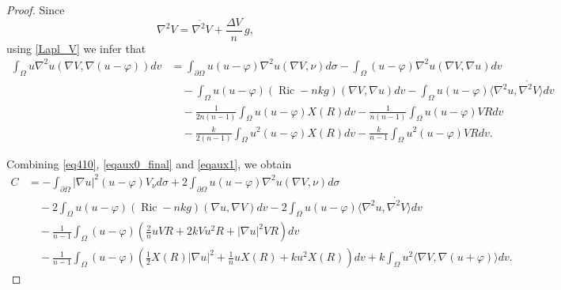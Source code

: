 \documentclass[10pt,a4paper]{amsart}
\begin{document}
\begin{proof}
Since
\[
\nabla^{2}V
=
\mathring{\nabla^{2}V}
+
\frac{\Delta V}{n}\,g,
\]
using \eqref{Lapl_V} we infer that
\begin{align}\label{eqaux1}
\int_{\Omega}u\nabla^{2}u(\nabla V,\nabla(u-\varphi))dv
&=
\int_{\partial\Omega}u(u-\varphi)\nabla^{2}u(\nabla V,\nu)d\sigma
-
\int_{\Omega}(u-\varphi)\nabla^{2}u(\nabla V,\nabla u) dv
\nonumber\\
&\quad
-
\int_{\Omega}u(u-\varphi)(\operatorname{Ric}-nkg)(\nabla V,\nabla u) dv
-
\int_{\Omega}u(u-\varphi)
\langle\nabla^{2}u,\mathring{\nabla^{2}V}\rangle dv
\nonumber\\
&\quad
-
\frac{1}{2n(n-1)}
\int_{\Omega}u(u-\varphi)X(R) dv
-
\frac{1}{n(n-1)}
\int_{\Omega}u(u-\varphi)VR dv
\nonumber\\
&\quad
-
\frac{k}{2(n-1)}
\int_{\Omega}u^{2}(u-\varphi)X(R) dv
-
\frac{k}{n-1}
\int_{\Omega}u^{2}(u-\varphi)VR dv.
\end{align}

Combining \eqref{eq410}, \eqref{eqaux0_final} and \eqref{eqaux1}, we obtain
\begin{align*}
C
&=
-\int_{\partial\Omega}|\nabla u|^{2}(u-\varphi)V_{\nu}d\sigma
+2\int_{\partial\Omega}u(u-\varphi)\nabla^{2}u(\nabla V,\nu)d\sigma
\nonumber\\
&\quad
-2\int_{\Omega}u(u-\varphi)(\operatorname{Ric}-nkg)(\nabla u,\nabla V)dv
-2\int_{\Omega}u(u-\varphi)\langle\nabla^{2}u,\mathring{\nabla^{2}V}\rangle dv
\nonumber\\
&\quad
-\frac{1}{n-1}\int_{\Omega}(u-\varphi)
\left(
\frac{2}{n}uVR
+2kVu^{2}R
+|\nabla u|^{2}VR
\right)dv
\nonumber\\
&\quad
-\frac{1}{n-1}\int_{\Omega}(u-\varphi)
\left(
\frac12 X(R)|\nabla u|^{2}
+\frac{1}{n}uX(R)
+ku^{2}X(R)
\right)dv
+k\int_{\Omega}u^{2}\langle\nabla V,\nabla(u+\varphi)\rangle dv.
\end{align*}


\end{proof}
\end{document}
